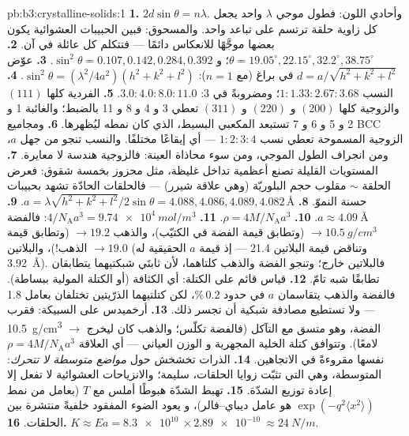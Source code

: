 \begin{solution}{pb:b3:crystalline-solids:1}
\textbf{1.} $2d\sin\theta = n\lambda$. وأحادي اللون: فطول موجي
$\lambda$ واحد يجعل كل زاوية حلقة ترتسم على تباعد واحد. والمسحوق: فبين
الحبيبات العشوائية يكون بعضها موجَّهًا للانعكاس دائمًا --- فتتكلم كل
عائلة في آن.
\textbf{2.} $\theta = 19.05^\circ, 22.15^\circ, 32.2^\circ,
38.75^\circ$؛ و $\sin^2\theta = 0.107, 0.142, 0.284, 0.392$.
\textbf{3.} عوّض $d = a/\sqrt{h^2+k^2+l^2}$ في براغ
(مع $n = 1$): $\sin^2\theta = (\lambda^2/4a^2)(h^2+k^2+l^2)$.
\textbf{4.} النسب $1 : 1.33 : 2.67 : 3.68$؛ ومضروبةً في 3:
$3.0 : 4.0 : 8.0 : 11.0$.
\textbf{5.} الفردية كلها $(111)$ والزوجية كلها $(200)$ و $(220)$ و
$(311)$ تعطي 3 و 4 و 8 و 11 بالضبط؛ والغائبة 1 و 2 و 5 و 6 و 7 تستبعد
المكعبي البسيط، الذي كان نمطه ليُظهرها.
\textbf{6.} ومجاميع BCC الزوجية المسموحة تعطي نسب
$1:2:3:4$ --- أي إيقاعًا مختلفًا. والنسب تنجو من جهل
$a$، ومن انجراف الطول الموجي، ومن سوء محاذاة العينة: فالزوجية
هندسة لا معايرة.
\textbf{7.} المستويات القليلة تصنع أعظمية تداخل غليظة، مثل
محزوز بخمسة شقوق: فعرض الحلقة $\sim$ مقلوب حجم
البلوريّة (وهي علاقة شيرر) --- فالحلقات الحادّة تشهد بحبيبات حسنة
النموّ.
\textbf{8.} $a = \lambda\sqrt{h^2+k^2+l^2}/2\sin\theta = 4.088,
4.086, 4.089, 4.082\,\unit{\angstrom}$.
\textbf{9.} $a \approx \qty{4.09}{\angstrom}$.
\textbf{10.} $\rho = 4M/N_{\text{A}}a^3$.
\textbf{11.} $4/N_{\text{A}}a^3 = \qty{9.74e4}{mol/m^3}$:
فالفضة $\to \qty{10.5}{g/cm^3}$ (وتطابق قيمة الفضة في
الكتيّب)، والذهب $\to 19.2$ (وتطابق قيمة الذهب!)، والبلاتين $\to 19.0$
(وتناقض قيمة البلاتين 21.4 --- إذ قيمة $a$ الحقيقية له
\qty{3.92}{\angstrom}). فالبلاتين خارج؛ وتنجو الفضة والذهب
كلتاهما، لأن ثابتَي شبكتيهما يتطابقان تطابقًا شبه تامّ.
\textbf{12.} قياس قائم على الكتلة: أي الكثافة (أو الكتلة المولية
ببساطة). فالفضة والذهب يتقاسمان $a$ في حدود 0.2\,\%، لكن كتلتيهما
الذرّيتين تختلفان بعامل 1.8 --- ولا تستطيع مصادفة شبكية أن
تجسر ذلك.
\textbf{13.} أرخميدس على السبيكة: فقرب \qty{10.5}{g/cm^3}
$\to$ الفضة، وهو متسق مع التآكل (فالفضة تكلّس؛
والذهب كان ليخرج لامعًا). وتتوافق كتلة الخلية المجهرية و
الوزن العياني --- أي العلاقة
$\rho = 4M/N_{\text{A}}a^3$ نفسها مقروءةً في الاتجاهين.
\textbf{14.} الذرات تخشخش حول \emph{مواضع متوسطة لا
تتحرك}:  المتوسطة، وهي التي تثبّت زوايا الحلقات، سليمة؛
والانزياحات العشوائية لا تفعل إلا إعادة توزيع الشدّة.
\textbf{15.} تهبط الشدّة هبوطًا أملس مع $T$ (بعامل من نمط
$\exp(-q^2\langle x^2\rangle)$ هو عامل ديباي--فالر)، و
يعود الضوء المفقود خلفيةً منتشرة بين الحلقات.
\textbf{16.} $K \approx Ea = \qty{8.3e10}{}\times
\qty{2.89e-10}{} \approx \qty{24}{N/m}$.

\end{solution}
